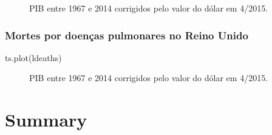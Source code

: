 \documentclass[
  letterpaper,
  DIV=11,
  numbers=noendperiod]{scrreprt}
\newenvironment{Shaded}{\begin{snugshade}}{\end{snugshade}}
\newcommand{\FunctionTok}[1]{\textcolor[rgb]{0.28,0.35,0.67}{#1}}
\newcommand{\NormalTok}[1]{\textcolor[rgb]{0.00,0.23,0.31}{#1}}
\theoremstyle{definition}
\theoremstyle{plain}
\theoremstyle{definition}
\theoremstyle{remark}
\begin{document}
\begin{figure}

\begin{minipage}[t]{\linewidth}

{\centering 


\caption{PIB entre 1967 e 2014 corrigidos pelo valor do dólar em
4/2015.}

}

\end{minipage}%

\end{figure}

\hypertarget{mortes-por-doenuxe7as-pulmonares-no-reino-unido}{%
\subsection{Mortes por doenças pulmonares no Reino
Unido}\label{mortes-por-doenuxe7as-pulmonares-no-reino-unido}}

\begin{Shaded}
\begin{Highlighting}[]
\FunctionTok{ts.plot}\NormalTok{(ldeaths)}
\end{Highlighting}
\end{Shaded}

\begin{figure}

\begin{minipage}[t]{\linewidth}

{\centering 


\caption{PIB entre 1967 e 2014 corrigidos pelo valor do dólar em
4/2015.}

}

\end{minipage}%

\end{figure}


\hypertarget{summary}{%
\chapter{Summary}\label{summary}}
\end{document}
